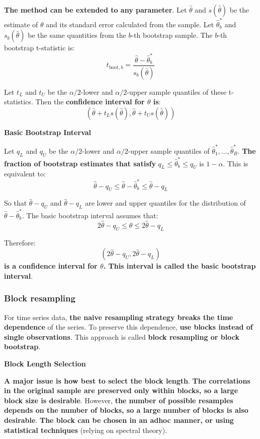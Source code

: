 \documentclass[12pt,a4paper]{article}
\begin{document}
\textbf{The method can be extended to any parameter}. Let $\hat{\theta}$ and $s(\hat{\theta})$ be the estimate of $\theta$ and its standard error calculated from the sample. Let $\hat{\theta}_b^*$ and $s_b(\hat{\theta})$ be the same quantities from the $b$-th bootstrap sample. The $b$-th bootstrap t-statistic is:
\[
t_{\text{boot},b} = \frac{\hat{\theta} - \hat{\theta}_b^*}{s_b(\hat{\theta})}
\]

Let $t_L$ and $t_U$ be the $\alpha/2$-lower and $\alpha/2$-upper sample quantiles of these t-statistics. Then the \textbf{confidence interval for $\theta$ is}:
\[
\left(\hat{\theta} + t_L s(\hat{\theta}), \hat{\theta} + t_U s(\hat{\theta})\right)
\]

\vspace{0.5em}

\textbf{Basic Bootstrap Interval}

Let $q_L$ and $q_U$ be the $\alpha/2$-lower and $\alpha/2$-upper sample quantiles of $\hat{\theta}_1^*, \ldots, \hat{\theta}_B^*$. \textbf{The fraction of bootstrap estimates that satisfy} $q_L \leq \hat{\theta}_b^* \leq q_U$ is $1 - \alpha$. This is equivalent to:
\[
\hat{\theta} - q_U \leq \hat{\theta} - \hat{\theta}_b^* \leq \hat{\theta} - q_L
\]

So that $\hat{\theta} - q_U$ and $\hat{\theta} - q_L$ are lower and upper quantiles for the distribution of $\hat{\theta} - \hat{\theta}_b^*$. The basic bootstrap interval assumes that:
\[
2\hat{\theta} - q_U \leq \theta \leq 2\hat{\theta} - q_L
\]

Therefore:
\[
\left(2\hat{\theta} - q_U, 2\hat{\theta} - q_L\right)
\]
\textbf{is a confidence interval for $\theta$. This interval is called the basic bootstrap interval}.

\subsubsection{Block resampling}

For time series data, \textbf{the naive resampling strategy breaks the time dependence} of the series. To preserve this dependence, \textbf{use blocks instead of single observations}. This approach is called \textbf{block resampling or block bootstrap}. 

\vspace{0.5em}

\textbf{Block Length Selection}

\textbf{A major issue is how best to select the block length}. \textbf{The correlations in the original sample are preserved only within blocks, so a large block size is desirable}. However, \textbf{the number of possible resamples depends on the number of blocks, so a large number of blocks is also desirable}. \textbf{The block can be chosen in an ad\-hoc manner, or using statistical techniques} (relying on spectral theory).
\end{document}
